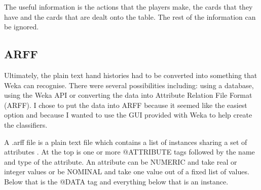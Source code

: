 The useful information is the actions that the players make, the cards that they have and the cards that are dealt onto the table. The rest of the information can be ignored. 


\subsection{ARFF}									%



Ultimately, the plain text hand histories had to be converted into something that Weka can recognise. There were several possibilities including: using a database, using the Weka API or converting the data into Attribute Relation File Format (ARFF). 
I chose to put the data into ARFF because it seemed like the easiest option and because I wanted to use the GUI provided with Weka to help create the classifiers. 

A .arff file is a plain text file which contains a list of instances sharing a set of attributes \cite{arff}. 
At the top is one or more @ATTRIBUTE tags followed by the name and type of the attribute. An attribute can be NUMERIC and take real or integer values or be NOMINAL and take one value out of a fixed list of values.
Below that is the @DATA tag and everything below that is an instance.

